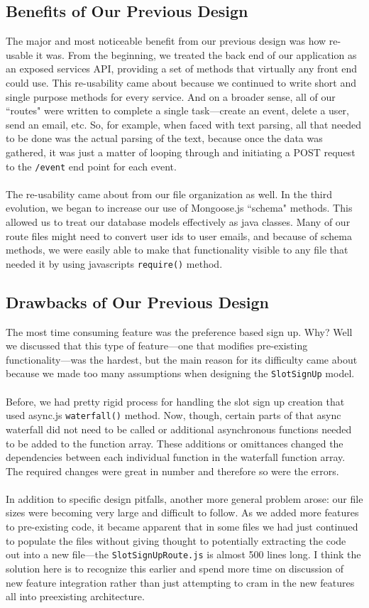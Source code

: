 \documentclass[11pt]{article}   %
\begin{document}
\subsection{Benefits of Our Previous Design}
The major and most noticeable benefit from our previous design was how re-usable it was. From the beginning, we treated the back end of our application as an exposed services API, providing a set of methods that virtually any front end could use. This re-usability came about because we continued to write short and single purpose methods for every service. And on a broader sense, all of our ``routes" were written to complete a single task---create an event, delete a user, send an email, etc. So, for example, when faced with text parsing, all that needed to be done was the actual parsing of the text, because once the data was gathered, it was just a matter of looping through and initiating a POST request to the \texttt{/event} end point for each event. \\~\\
The re-usability came about from our file organization as well. In the third evolution, we began to increase our use of Mongoose.js ``schema" methods. This allowed us to treat our database models effectively as java classes. Many of our route files might need to convert user ids to user emails, and because of schema methods, we were easily able to make that functionality visible to any file that needed it by using javascripts \texttt{require()} method.

\subsection{Drawbacks of Our Previous Design}
The most time consuming feature was the preference based sign up. Why? Well we discussed that this type of feature---one that modifies pre-existing functionality---was the hardest, but the main reason for its difficulty came about because we made too many assumptions when designing the \texttt{SlotSignUp} model.\\~\\
Before, we had pretty rigid process for handling the slot sign up creation that used async.js \texttt{waterfall()} method. Now, though, certain parts of that async waterfall did not need to be called or additional asynchronous functions needed to be added to the function array. These additions or omittances changed the dependencies between each individual function in the waterfall function array. The required changes were great in number and therefore so were the errors. \\~\\
In addition to specific design pitfalls, another more general problem arose: our file sizes were becoming very large and difficult to follow. As we added more features to pre-existing code, it became apparent that in some files we had just continued to populate the files without giving thought to potentially extracting the code out into a new file---the \texttt{SlotSignUpRoute.js} is almost 500 lines long. I think the solution here is to recognize this earlier and spend more time on discussion of new feature integration rather than just attempting to cram in the new features all into preexisting architecture. 
\end{document}
